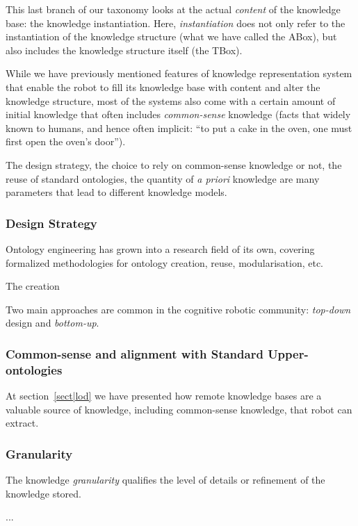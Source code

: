 This last branch of our taxonomy looks at the actual \emph{content} of the
knowledge base: the knowledge instantiation. Here, \emph{instantiation} does
not only refer to the instantiation of the knowledge structure (what we have
called the ABox), but also includes the knowledge structure itself (the TBox).

While we have previously mentioned features of knowledge representation system
that enable the robot to fill its knowledge base with content and alter the
knowledge structure, most of the systems also come with a certain amount of
initial knowledge that often includes \emph{common-sense} knowledge (\ie facts
that widely known to humans, and hence often implicit: ``to put a cake in the
oven, one must first open the oven's door'').

The design strategy, the choice to rely on common-sense knowledge or not, the
reuse of standard ontologies, the quantity of {\it a priori} knowledge are many
parameters that lead to different knowledge models.

\subsubsection{Design Strategy}
\label{sect|design-strategies}

Ontology engineering has grown into a research field of its own, covering
formalized methodologies for ontology creation, reuse, modularisation, etc.

The creation

Two main approaches are common in the cognitive robotic community:
\emph{top-down} design and \emph{bottom-up}.

\subsubsection{Common-sense and alignment with Standard Upper-ontologies}

At section~\ref{sect|lod} we have presented how remote knowledge bases are a
valuable source of knowledge, including common-sense knowledge, that robot can
extract.

\subsubsection{Granularity}

The knowledge \emph{granularity} qualifies the level of details or refinement
of the knowledge stored.

...

